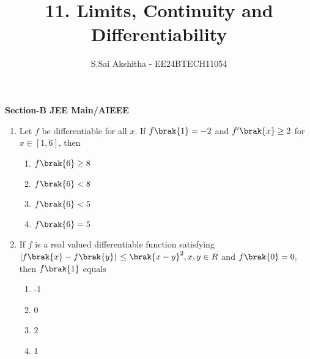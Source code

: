 \documentclass[journal,12pt,onecolumn]{IEEEtran}
\theoremstyle{remark}
\begin{document}

\vspace{3cm}

\title{11. Limits, Continuity and Differentiability }
\author{S.Sai Akshitha - EE24BTECH11054}
\newpage
\maketitle
\bigskip

\renewcommand{\thefigure}{\theenumi}
\renewcommand{\thetable}{\theenumi}
\begin{large}
\textbf{Section-B JEE Main/AIEEE}
\end{large}
\begin{enumerate}
    \item Let $f$ be differentiable for all $x$. If $f\brak{1}=-2$ and $f'\brak{x} \geq 2$ for $x \in [1,6]$, then   \hfill{}
    
        \begin{enumerate}
    \item $f\brak{6}\geq 8$ \item$f\brak{6} < 8$\item$f\brak{6} <5$\item$f\brak{6}=5$
     \end{enumerate} 
     
    \item If $f$ is a real valued differentiable function satisfying $\lvert f\brak{x} -f\brak{y}\rvert$ $ \leq\brak{x-y}^2,x,y\in R$ and $f\brak{0}=0,$ then $f\brak{1}$ equals \hfill{}
     \begin{multicols}{4}
        \begin{enumerate}
     \item -1\item 0\item 2\item 1
     \end{enumerate} 
     \end{multicols}
     

\end{enumerate}
\end{document}
